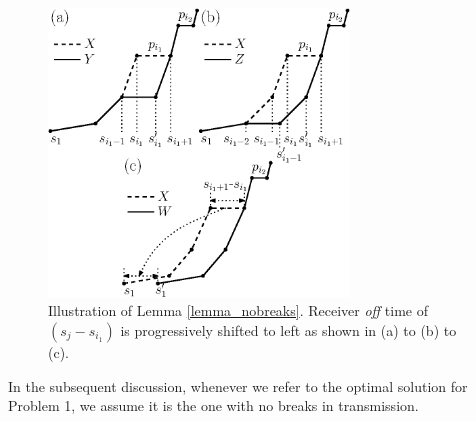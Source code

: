 \begin{figure}[htb]
  \centering
  \centerline{\includegraphics[width=8cm]{Lemma2_modified.eps}}
\caption{Illustration of Lemma \ref{lemma_nobreaks}. Receiver \textit{off} time of $(s_{j}-s_{i_1})$ is progressively shifted to left as shown in (a) to (b) to (c).}\label{fig_Lemma2}
\end{figure}
In the subsequent discussion, whenever we refer to the optimal solution for Problem 1, we assume it is the one with no breaks in transmission.
%
%
%
